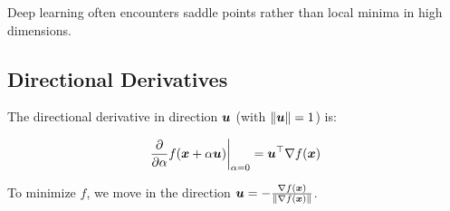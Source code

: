 \begin{center}
\end{center}

Deep learning often encounters saddle points rather than local minima in high dimensions.

\subsection{Directional Derivatives}

The directional derivative in direction $\boldsymbol{u}$ (with $\|\boldsymbol{u}\| = 1$) is:

\begin{equation}
\frac{\partial}{\partial \alpha} f(\boldsymbol{x} + \alpha \boldsymbol{u}) \bigg|_{\alpha=0} = \boldsymbol{u}^\top \nabla f(\boldsymbol{x})
\end{equation}

To minimize $f$, we move in the direction $\boldsymbol{u} = -\frac{\nabla f(\boldsymbol{x})}{\|\nabla f(\boldsymbol{x})\|}$.
